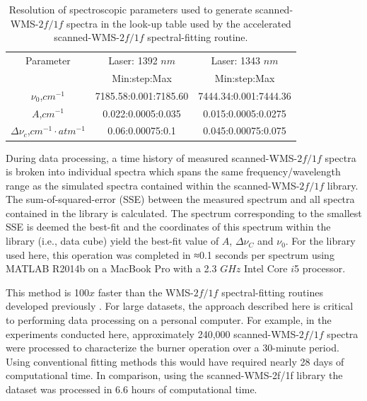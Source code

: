\begin{table}[h]
\begin{center}
\begin{tabular}{ c c c }
\hline
Parameter & Laser: 1392 $nm$  & Laser: 1343 $nm$ \\
 & Min:step:Max & Min:step:Max\\ \hline
$\nu_0$,$cm^{-1}$ & 7185.58:0.001:7185.60 & 7444.34:0.001:7444.36\\ 
$A$,$cm^{-1}$ & 0.022:0.0005:0.035 & 0.015:0.0005:0.0275\\ 
$\Delta\nu_c$,$cm^{-1}\cdot atm^{-1}$ & 0.06:0.00075:0.1 & 0.045:0.00075:0.075\\ \hline
\end{tabular}
\caption{Resolution of spectroscopic parameters used to generate scanned-WMS-$2f/1f$ spectra in the look-up table used by the accelerated scanned-WMS-$2f/1f$ spectral-fitting routine.}
\label{table:ch4_2}
\end{center}
\end{table}

During data processing, a time history of measured scanned-WMS-$2f/1f$ spectra is broken into individual spectra which spans the same frequency/wavelength range as the simulated spectra contained within the scanned-WMS-$2f/1f$ library. The sum-of-squared-error (SSE) between the measured spectrum and all spectra contained in the library is calculated. The spectrum corresponding to the smallest SSE is deemed the best-fit and the coordinates of this spectrum within the library (i.e., data cube) yield the best-fit value of $A$, $\Delta\nu_C$ and $\nu_0$. For the library used here, this operation was completed in ≈0.1 seconds per spectrum using MATLAB R2014b on a MacBook Pro with a 2.3 $GHz$ Intel Core $i$5 processor. 

\noindent This method is 100$x$ faster than the WMS-$2f/1f$ spectral-fitting routines developed previously \cite{Goldenstein2014}. For large datasets, the approach described here is critical to performing data processing on a personal computer. For example, in the experiments conducted here, approximately 240,000 scanned-WMS-$2f/1f$ spectra were processed to characterize the burner operation over a 30-minute period. Using conventional fitting methods this would have required nearly 28 days of computational time. In comparison, using the scanned-WMS-2f/1f library the dataset was processed in 6.6 hours of computational time.

